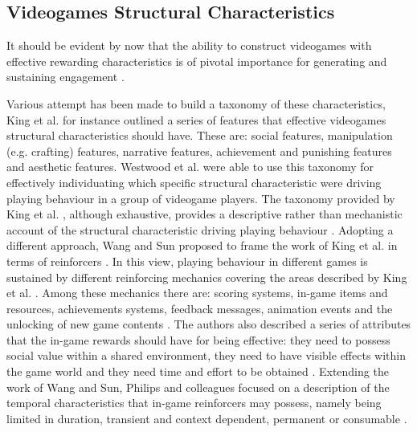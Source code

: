 \subsection{Videogames Structural Characteristics}
\label{factors_engagement}
It should be evident by now that the ability to construct videogames with effective rewarding characteristics is of pivotal importance for generating and sustaining engagement \cite{king2010role, king2010video, yannakakis2013player}. 

Various attempt has been made to build a taxonomy of these characteristics, King et al. \cite{king2010video} for instance outlined a series of features that effective videogames structural characteristics should have. These are: social features, manipulation (e.g. crafting) features, narrative features, achievement and punishing features and aesthetic features. Westwood et al. \cite{westwood2010role} were able to use this taxonomy for effectively individuating which specific structural characteristic were driving playing behaviour in a group of videogame players. The taxonomy provided by King et al. \cite{king2010video}, although exhaustive, provides a descriptive rather than mechanistic account of the structural characteristic driving playing behaviour \cite{king2010role}. Adopting a different approach, Wang and Sun proposed to frame the work of King et al. in terms of reinforcers \cite{king2010video, wang2011game}. In this view, playing behaviour in different games is sustained by different reinforcing mechanics covering the areas described by King et al. \cite{king2010video, wang2011game}. Among these mechanics there are: scoring systems, in-game items and resources, achievements systems, feedback messages, animation events and the unlocking of new game contents \cite{wang2011game}. The authors also described a series of attributes that the in-game rewards should have for being effective: they need to possess social value within a shared environment, they need to have visible effects within the game world and they need time and effort to be obtained \cite{wang2011game}. Extending the work of Wang and Sun, Philips and colleagues focused on a description of the temporal characteristics that in-game reinforcers may possess, namely being limited in duration, transient and context dependent, permanent or consumable \cite{phillips2013videogame}. 


